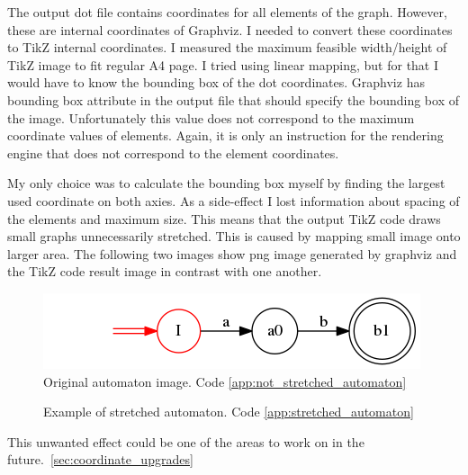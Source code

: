 \documentclass{ctuthesis}
\begin{document}
The output dot file contains coordinates for all elements of the graph. However, these are internal coordinates of Graphviz. I needed to convert these coordinates to TikZ internal coordinates. I measured the maximum feasible width/height of TikZ image to fit regular A4 page. I tried using linear mapping, but for that I would have to know the bounding box of the dot coordinates. Graphviz has bounding box attribute in the output file that should specify the bounding box of the image. Unfortunately this value does not correspond to the maximum coordinate values of elements. Again, it is only an instruction for the rendering engine that does not correspond to the element coordinates.

My only choice was to calculate the bounding box myself by finding the largest used coordinate on both axies. As a side-effect I lost information about spacing of the elements and maximum size. This means that the output TikZ code draws small graphs unnecessarily stretched. This is caused by mapping small image onto larger area. The following two images show png image generated by graphviz and the TikZ code result image in contrast with one another. 

\begin{figure}[H]
\includegraphics[width=0.5\linewidth]{figures/not_stretched.png}
\caption{Original automaton image. Code \ref{app:not_stretched_automaton}}
\label{fig:not_stretched_automaton}
\end{figure}

\begin{figure}[H]
\caption{Example of stretched automaton. Code \ref{app:stretched_automaton}}
\label{fig:stretched_automaton}
\end{figure}

This unwanted effect could be one of the areas to work on in the future.~\ref{sec:coordinate_upgrades}
\end{document}
